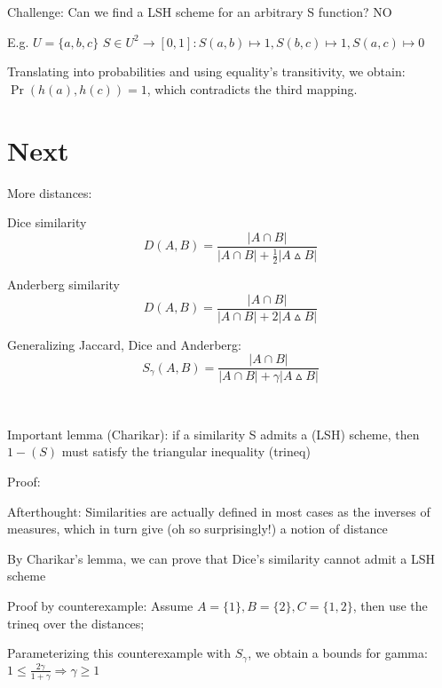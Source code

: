 \documentclass{report}
\begin{document}
	Challenge: Can we find a LSH scheme for an arbitrary S function? NO
	
	E.g. $U = \{a, b, c\}$
	$S \in U^2 \rightarrow [0, 1] : S(a, b) \mapsto 1, S(b, c) \mapsto 1, S(a, c) \mapsto 0$ %
	
	Translating into probabilities and using equality's transitivity, we obtain: $\Pr(h(a), h(c))=1$, which contradicts the third mapping.
	
	 
	
	
	\chapter{Next}
	
	More distances:
	
	Dice similarity
	\begin{equation}
	\displaystyle D(A, B) = \frac{|A\cap B|}{|A\cap B| + \frac{1}{2}|A\vartriangle B|}
	\end{equation}
	
	Anderberg similarity
	\begin{equation}
	\displaystyle D(A, B) = \frac{|A\cap B|}{|A\cap B| + 2|A\vartriangle B|}
	\end{equation}
	
	Generalizing Jaccard, Dice and Anderberg: 
	\begin{equation}
	\displaystyle S_\gamma(A, B) = \frac{|A\cap B|}{|A\cap B| + \gamma|A\vartriangle B|}
	\end{equation}
	
	\
	
	Important lemma (Charikar): if a similarity S admits a (LSH) scheme, then $1-(S)$ must satisfy the triangular inequality (trineq)
	
	Proof: %
	
	Afterthought: Similarities are actually defined in most cases as the inverses of measures, which in turn give (oh so surprisingly!) a notion of distance
	\
	
	By Charikar's lemma, we can prove that Dice's similarity cannot admit a LSH scheme
	
	Proof by counterexample: Assume $A=\{1\}, B=\{2\}, C=\{1, 2\}$, then use the trineq over the distances; %
	
	Parameterizing this counterexample with $S_\gamma$, we obtain a bounds for gamma: $1 \leq \frac{2\gamma}{1 + \gamma} \Rightarrow \gamma \geq 1$
	
	\
	
\end{document}
